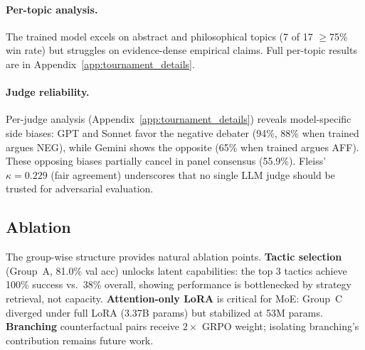 \paragraph{Per-topic analysis.}
The trained model excels on abstract and philosophical topics (7 of 17
$\geq$75\% win rate) but struggles on evidence-dense empirical claims.
Full per-topic results are in Appendix~\ref{app:tournament_details}.

\paragraph{Judge reliability.}
\label{sec:judge_bias}
Per-judge analysis (Appendix~\ref{app:tournament_details}) reveals
model-specific side biases: GPT and Sonnet favor the negative debater
(94\%, 88\% when trained argues NEG), while Gemini shows the opposite
(65\% when trained argues AFF). These opposing biases partially cancel in
panel consensus (55.9\%). Fleiss' $\kappa = 0.229$ (fair agreement)
underscores that no single LLM judge should be trusted for adversarial
evaluation.

\subsection{Ablation}
\label{sec:phase3}

The group-wise structure provides natural ablation points.
\textbf{Tactic selection} (Group~A, 81.0\% val acc) unlocks latent
capabilities: the top 3 tactics achieve 100\% success vs.\ 38\% overall,
showing performance is bottlenecked by strategy retrieval, not capacity.
\textbf{Attention-only LoRA} is critical for MoE: Group~C diverged under
full LoRA (3.37B params) but stabilized at 53M params.
\textbf{Branching} counterfactual pairs receive $2\times$ GRPO weight;
isolating branching's contribution remains future work.

